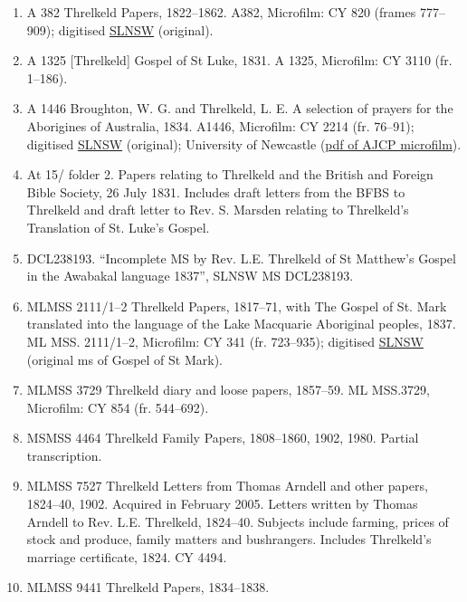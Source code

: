 \begin{enumerate}
    \item A 382 Threlkeld Papers, 1822--1862. A382, Microfilm: CY 820 (frames 777--909); digitised \href{https://transcripts.sl.nsw.gov.au/document/382-reverend-lancelot-edward-threlkeld-papers-1822-1862}{SLNSW} (original).
    \item A 1325 [Threlkeld] Gospel of St Luke, 1831. A 1325, Microfilm: CY 3110 (fr. 1--186).
    \item A 1446 Broughton, W. G. and Threlkeld, L. E. A selection of prayers for the Aborigines of Australia, 1834. A1446, Microfilm: CY 2214 (fr. 76--91); digitised \href{https://transcripts.sl.nsw.gov.au/document/1446-selection-prayers-aborigines-1834-translated-northumberland-dialect-l-e-threlkeld}{SLNSW} (original); University of Newcastle (\href{https://downloads.newcastle.edu.au/library/cultural%20collections/pdf/1834-prayers.pdf}{pdf of AJCP microfilm}).
    \item At 15/ folder 2. Papers relating to Threlkeld and the British and Foreign Bible Society, 26 July 1831. Includes draft letters from the BFBS to Threlkeld and draft letter to Rev. S. Marsden relating to Threlkeld’s Translation of St. Luke’s Gospel.
    \item DCL238193. “Incomplete MS by Rev. L.E. Threlkeld of St Matthew’s Gospel in the Awabakal language 1837”, SLNSW MS DCL238193.
    \item MLMSS 2111/1--2 Threlkeld Papers, 1817--71, with The Gospel of St. Mark translated into the language of the Lake Macquarie Aboriginal peoples, 1837. ML MSS. 2111/1--2, Microfilm: CY 341 (fr. 723--935); digitised \href{https://transcripts.sl.nsw.gov.au/document/series-02-gospel-st-mark-translated-language-lake-macquarie-aborigines-1837}{SLNSW} (original ms of Gospel of St Mark).
    \item MLMSS 3729 Threlkeld diary and loose papers, 1857--59. ML MSS.3729, Microfilm: CY 854 (fr. 544--692).
    \item MSMSS 4464 Threlkeld Family Papers, 1808--1860, 1902, 1980. Partial transcription.
    \item MLMSS 7527 Threlkeld Letters from Thomas Arndell and other papers, 1824--40, 1902. Acquired in February 2005. Letters written by Thomas Arndell to Rev. L.E. Threlkeld, 1824--40. Subjects include farming, prices of stock and produce, family matters and bushrangers. Includes Threlkeld’s marriage certificate, 1824. CY 4494.
    \item MLMSS 9441 Threlkeld Papers, 1834--1838.

\end{enumerate}
